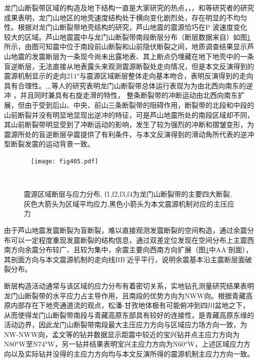 龙门山断裂带区域的构造及地下结构一直是大家研究的热点，\citet{Zhang2013}，\citet{Wang2010}，和\citet{Zhang2011}等研究者的研究成果表明，龙门山地区的地壳速度结构处于横向变化剧烈处，存在明显的不均匀性。根据对龙门山断裂带地壳结构的研究，芦山地震的震源恰巧在P 波速度变化较大的区域。芦山地震震中与龙门山断裂带南段断层分布（断层数据来自）如图\ref{fig405}所示，由图可知震中位于南段前山断裂和山前隐伏断裂之间，地质调查结果显示芦山地震的发震断层为一条现今尚未出露地表、其上断点仍埋藏在地下地壳中的一条盲逆断层，无法直接从地表露头来观测震源断裂处走向情况，但是本文反演得到的震源机制显示的走向211°与震源区域断层整体走向基本吻合，表明反演得到的走向具有合理性。,,\citet{Densmore2007},等人的研究表明龙门山断裂带总体运行表现为为由北西向南东的逆冲 ，并且同时兼具有右旋走滑的特性， 整条断裂带的冲断运动由北西向南东扩展，但由于受到后山、中央、前山三条断裂带的阻碍作用，断裂带的北段和中段的山前断裂并没有明显地显现出逆冲的特征，可是芦山地震所处的南段区域却不同，其山前断裂带明显受到了冲断运动的影响，发生了较为强烈的冲断和摺皱变形，为震源所处的盲逆断层孕震提供了有利条件，与本文反演得到的滑动角所代表的逆冲型断裂发震的运动背景一致。
\begin{figure}
\centering
  \texttt{[image: fig405.pdf]}
  \caption{ 震源区域断层与应力分布, f1,f2,f3,f4为龙门山断裂带的主要四大断裂,灰色大箭头为区域平均应力,黑色小箭头为本文震源机制对应的主压应力}
  \label{fig405}
\end{figure}

由于芦山地震发震断裂为盲断裂，难以直接观测发震断裂的空间构造，通过余震分布可以一定程度重现发震断裂的结构信息，\citet{zhangguangwei2013}通过双差定位发现在空间分布上主震西南方向余震分布较广、且较为集中，余震主要向西南方向扩展（图\ref{fig405}中AA'剖面），其剖面方向与本文震源机制的走向线BB'近乎平行，说明余震基本沿主震断层面破裂分布。

断层构造活动通常与该区域的应力分布有着密切关系，实地钻孔测量研究结果表明龙门山断裂带的水平应力占主导作用，且南段的优势方向为NWW向。根据青藏高原内部存在下地壳通道流的观点\citep{Royden1997,Clark2000,Meng2005,Burchfiel1995,Harris2007}，松潘-甘孜地体极有可能俯冲到四川盆地之下，从而使得龙门山断裂带南段与青藏高原东部具有较好的连接性，是青藏高原东缘的活动边界，因此龙门山断裂带南段最大主压应力方向与区域应力场方向一致，为NW-NWW向，孟文等的钻井数据显示距震中较近的宝兴钻井点主应力方向为N80°W至N74°W，另一钻井结果表明宝兴主应力方向为N60°W，上述区域应力方向以及实际钻井没得的主应力方向均与本文反演所得的震源机制主应力方向一致。

